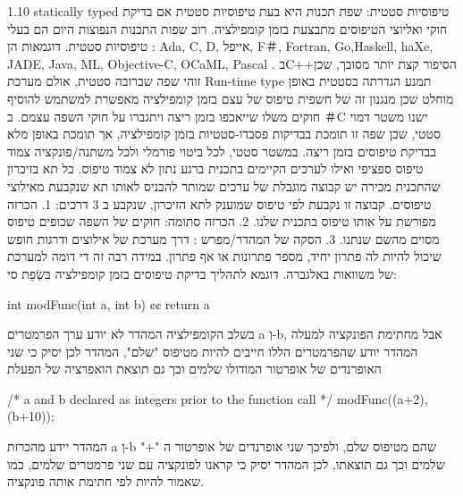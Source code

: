 \begin{טבלא}[!htbp]
      1.10 statically typed טיפוסיות סטטית:
      שפת תכנות היא בעת טיפוסיות סטטית אם בדיקת חוקי ואליוצי הטיפוסים מתבצעת בזמן קומפילציה. רוב שפות התכנות הנפוצות היום הם בעלי טיפוסיות סטטית. דוגמאות הן :
      Ada, C, D, אייפל, F＃, Fortran, Go,Haskell, haXe, JADE, Java, ML, Objective-C, OCaML, Pascal .
      בC++הסיפור קצת יותר מסובך, שכן זוהי שפה שברובה סטטית, אולם מערכת Run-time type תמנע הגדרתה בסטטית באופן מוחלט שכן מנגנון זה של חשפית טיפוס של עצם בזמן קומפילציה מאפשרת למשתמש להוסיף חוקים משלו שייאכפו בזמן ריצה ויתגברו על חוקי השפה עצמם.
      ב ＃C ישנו משטר דמוי סטטי, שכן שפה זו תומכת בבדיקות פסבדו-סטטיות בזמן קומפילציה, אך תומכת באופן מלא בבדיקת טיפוסים בזמן ריצה.
      במשטר סטטי, לכל ביטוי פורמלי ולכל משתנה/פונקציה צמוד טיפוס ספציפי ואילו לערכים הקיימים בתכנית ברגע נתון לא צמוד טיפוס. כל תא בזיכרון שהתכנית מכירה יש קבוצה מוגבלת של ערכים שמותר להכניס לאותו תא שנקבעת מאילוצי טיפוסים. קבוצה זו נקבעת לפי טיפוס שמוענק לתא הזיכרון, שנקבע ב 3 דרכים:
      1. הכרזה מפורשת על אותו טיפוס בתכנית שלנו.
      2. הכרזה סתומה: חוקים של השפה שכופים טיפוס מסוים מהשם שנתנו.
      3. הסקה של המהדר/מפרש : דרך מערכת של אילוצים ודרגות חופש שיכול להיות לה פתרון יחיד, מספר פתרונות או אף פתרון. במידה רבה זה די דומה למערכת של משוואות באלגברה.
      דוגמא לתהליך בדיקת טיפוסים בזמן קומפילציה בִּשְׂפַת סי:

      int modFunc(int a, int b) {¢¢
        return a%
      }

      בשלב הקומפילציה המהדר לא יודע ערך הפרמטרים a וְ-b, אבל מחתימת הפונקציה למעלה המהדר יודע שהפרמטרים הללו חייבים להיות מטיפוס "שלם", המהדר לכן יסיק כי שני האופרנדים של אופרטור המודולו שלמים וכך גם תוצאת הואפרציה של הפעלת %

      /* a and b declared as integers prior to the function call */
      modFunc((a+2),(b+10));

      המהדר יידע מהכרזת a וְ-b שהם מטיפוס שלם, ולפיכך שני אופרנדים של אופרטור ה "+" שלמים וכך גם תוצאתו, לכן המהדר יסיק כי קראנו לפונקציה עם שני פרמטרים שלמים, כמו שאמור להיות לפי חתימת אותה פונקציה.


\end{טבלא}
